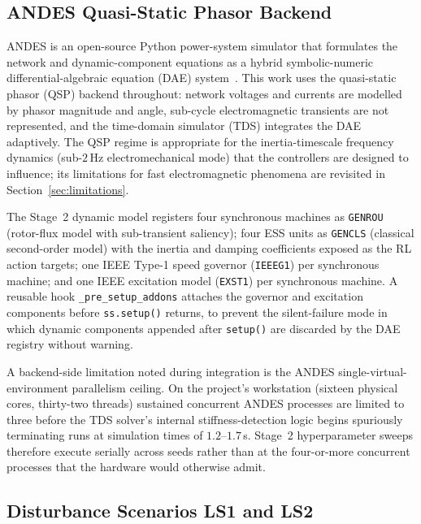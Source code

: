 \documentclass{unnc-fyp}
\begin{document}
\subsection{ANDES Quasi-Static Phasor Backend}
\label{sec:andes-backend}

ANDES is an open-source Python power-system simulator that
formulates the network and dynamic-component equations as a
hybrid symbolic-numeric differential-algebraic equation (DAE)
system~\cite{cui2021andes}.
This work uses the quasi-static phasor (QSP) backend throughout:
network voltages and currents are modelled by phasor magnitude and
angle, sub-cycle electromagnetic transients are not represented,
and the time-domain simulator (TDS) integrates the DAE adaptively.
The QSP regime is appropriate for the inertia-timescale frequency
dynamics (sub-$2$\,Hz electromechanical mode) that the controllers
are designed to influence;
its limitations for fast electromagnetic phenomena are revisited
in Section~\ref{sec:limitations}.

The Stage~2 dynamic model registers four synchronous machines as
\texttt{GENROU} (rotor-flux model with sub-transient saliency);
four ESS units as \texttt{GENCLS} (classical second-order model)
with the inertia and damping coefficients exposed as the RL
action targets; one IEEE Type-1 speed governor (\texttt{IEEEG1})
per synchronous machine; and one IEEE excitation model
(\texttt{EXST1}) per synchronous machine.
A reusable hook \verb|_pre_setup_addons| attaches the governor and
excitation components before \texttt{ss.setup()} returns, to
prevent the silent-failure mode in which dynamic components
appended after \texttt{setup()} are discarded by the DAE registry
without warning.

A backend-side limitation noted during integration is the ANDES
single-virtual-environment parallelism ceiling.
On the project's workstation (sixteen physical cores, thirty-two
threads) sustained concurrent ANDES processes are limited to three
before the TDS solver's internal stiffness-detection logic begins
spuriously terminating runs at simulation times of
$1.2$--$1.7$\,s.
Stage~2 hyperparameter sweeps therefore execute serially across
seeds rather than at the four-or-more concurrent processes that
the hardware would otherwise admit.

\subsection{Disturbance Scenarios LS1 and LS2}
\label{sec:stage2-scenarios}
\end{document}
